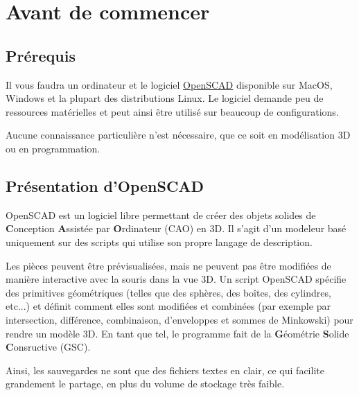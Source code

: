 \section{Avant de commencer}

\subsection{Prérequis}

Il vous faudra un ordinateur et le logiciel \hyperref[download]{OpenSCAD} disponible sur MacOS, Windows et la plupart des distributions Linux.
Le logiciel demande peu de ressources matérielles et peut ainsi être utilisé sur beaucoup de configurations.

Aucune connaissance particulière n'est nécessaire, que ce soit en modélisation 3D ou en programmation.


\subsection{Présentation d'OpenSCAD}

OpenSCAD est un logiciel libre permettant de créer des objets solides de \textbf{C}onception \textbf{A}ssistée par \textbf{O}rdinateur (CAO) en 3D.
Il s'agit d'un modeleur basé uniquement sur des scripts qui utilise son propre langage de description.

Les pièces peuvent être prévisualisées, mais ne peuvent pas être modifiées de manière interactive avec la souris dans la vue 3D.
Un script OpenSCAD spécifie des primitives géométriques (telles que des sphères, des boîtes, des cylindres, etc...) et définit comment elles sont modifiées et combinées (par exemple par intersection, différence, combinaison, d'enveloppes et sommes de Minkowski) pour rendre un modèle 3D.
En tant que tel, le programme fait de la \textbf{G}éométrie \textbf{S}olide \textbf{C}onsructive (GSC).

Ainsi, les sauvegardes ne sont que des fichiers textes en clair, ce qui facilite grandement le partage, en plus du volume de stockage très faible.